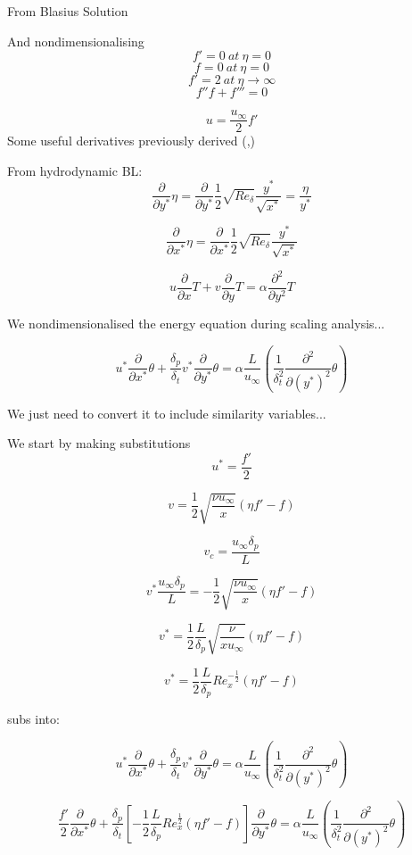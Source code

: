 \documentclass[11pt]{article}
\begin{document}
From Blasius Solution

And nondimensionalising 
$$f'=0\ at\ \eta=0$$
$$f=0\ at\ \eta=0$$
$$f' =2 \ at \ \eta\rightarrow \infty$$
$$f''f+f'''=0$$

$$u = \frac{u_\infty}{2} f'$$
Some useful derivatives previously derived (\cite{bejan2013convection},\cite{welty2014fundamentals})

From hydrodynamic BL:
$$\frac{\partial}{\partial y^*} \eta =  \frac{\partial}{\partial y^*} \frac{1}{2} \sqrt{Re_\delta} \frac{y^*}{\sqrt{x^*}} = \frac{\eta}{y^*}$$


$$ \frac{\partial}{\partial x^*} \eta =  \frac{\partial}{\partial x^*}\frac{1}{2} \sqrt{Re_\delta} \frac{y^*}{\sqrt{x^*}}  $$



$$ u \frac{\partial}{\partial x} T + v \frac{\partial }{\partial y} T  = \alpha \frac{\partial^2 }{\partial y^2}T  $$ 

We nondimensionalised the energy equation during scaling analysis...

$$u^* \frac{\partial}{\partial x^*} \theta + \frac{\delta_p}{ \delta_t} v^* \frac{\partial }{\partial y^*} \theta   = \alpha \frac{L}{u_\infty} (\frac{1}{\delta_t^2} \frac{\partial^2 }{\partial (y^*)^2} \theta ) $$ 

We just need to convert it to include similarity variables...

We start by making substitutions
$$u^* = \frac{f'}{2}$$

$$v= \frac{1}{2} \sqrt{\frac{\nu u_\infty}{x}}(\eta f' -f)$$

$$v_c = \frac{u_\infty \delta_p}{L}$$

$$v^* \frac{u_\infty \delta_p}{L} = -\frac{1}{2} \sqrt{\frac{\nu u_\infty}{x}}(\eta f' -f)$$

$$v^*  = \frac{1}{2} \frac{L}{\delta_p} \sqrt{\frac{\nu }{x u_\infty}}(\eta f' -f)$$

$$v^*  = \frac{1}{2} \frac{L}{\delta_p} Re_x^{-\frac{1}{2}} (\eta f' -f)$$


subs into:

$$u^* \frac{\partial}{\partial x^*} \theta + \frac{\delta_p}{ \delta_t} v^* \frac{\partial }{\partial y^*} \theta   = \alpha \frac{L}{u_\infty} (\frac{1}{\delta_t^2} \frac{\partial^2 }{\partial (y^*)^2} \theta ) $$ 

$$\frac{f'}{2} \frac{\partial}{\partial x^*} \theta + \frac{\delta_p}{ \delta_t} \left[ -\frac{1}{2} \frac{L}{\delta_p} Re_x^{\frac{1}{2}} (\eta f' -f) \right] \frac{\partial }{\partial y^*} \theta   = \alpha \frac{L}{u_\infty} (\frac{1}{\delta_t^2} \frac{\partial^2 }{\partial (y^*)^2} \theta ) $$ 
\end{document}
